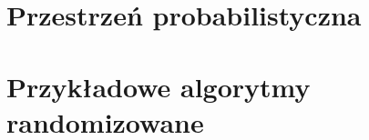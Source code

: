 {
\makeatletter
{}
\makeatother
\graphicspath{{../probabil}}

%

\section{Przestrzeń probabilistyczna}


\section{Przykładowe algorytmy randomizowane}

}